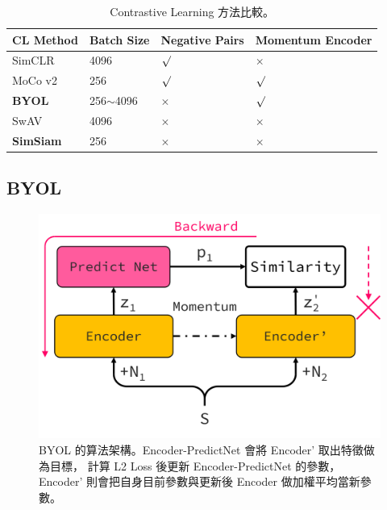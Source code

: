 \documentclass[10pt,twocolumn,letterpaper]{article}
\begin{document}
\begin{CJK}{UTF8}{bkai}
   \begin{table}[h]
      \caption{Contrastive Learning 方法比較。\label{table:CL-methods}}
      \begin{center}
         \begin{tabular}{ m{1.7cm} m{1.7cm} m{1.7cm} m{1.7cm} }
            CL Method        & Batch Size    & Negative Pairs     & Momentum Encoder \\
            \hline
            SimCLR           & 4096          & $\surd$            & $\times$         \\
            \hline
            MoCo v2          & 256           & $\surd$            & $\surd$          \\
            \hline
            \textbf{BYOL}    & 256$\sim$4096 & \textbf{$\times$}  & $\surd$          \\
            \hline
            SwAV             & 4096          & $\times$           & $\times$         \\
            \hline
            \textbf{SimSiam} & 256           & \textbf{$\times$ } & $\times$         \\
            \hline
         \end{tabular}
      \end{center}
   \end{table}

   \subsection{BYOL}
   \begin{figure}
      \begin{center}
         \includegraphics[width=1\linewidth]{img/BYOL.png}
      \end{center}
      \caption{BYOL 的算法架構。Encoder-PredictNet 會將 Encoder' 取出特徵做為目標，
         計算 L2 Loss 後更新 Encoder-PredictNet 的參數，
         Encoder' 則會把自身目前參數與更新後 Encoder 做加權平均當新參數。\label{fig:BYOL}}
   \end{figure}


\end{CJK}
\end{document}
